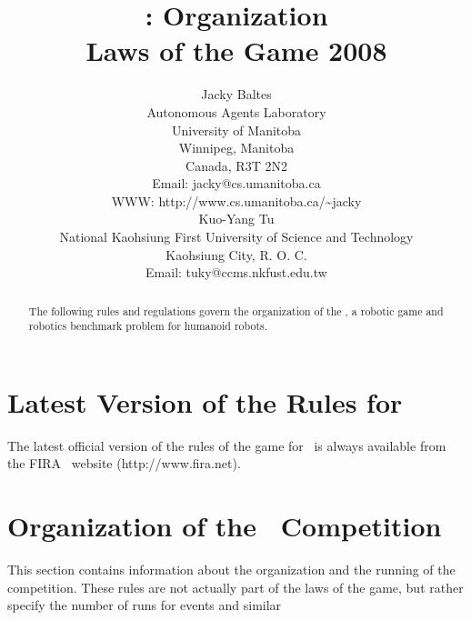 \documentclass[12pt]{hurocup}
\begin{document}
\title{\HuroCup: Organization\\
  Laws of the Game 2008}

\author{Jacky Baltes\\
Autonomous Agents Laboratory\\
University of Manitoba\\
Winnipeg, Manitoba\\
Canada, R3T 2N2\\
Email: jacky@cs.umanitoba.ca\\
WWW: http://www.cs.umanitoba.ca/\~{ }jacky\\[5mm]
Kuo-Yang Tu\\
National Kaohsiung First University of Science and Technology\\
Kaohsiung City, R. O. C.\\
Email: tuky@ccms.nkfust.edu.tw\\
}

\maketitle
\begin{abstract}
The following rules and regulations govern the organization of the
\HuroCup, a robotic game and robotics benchmark problem for humanoid
robots.
%
\end{abstract}

\section*{Latest Version of the Rules for \HuroCup}
\label{sec:updates}

The latest official version of the rules of the game for \HuroCup\ is
always available from the FIRA \HuroCup\ website (http://www.fira.net).

\newpage

\section{Organization of the \HuroCup\ Competition}
\label{sec:organization} 

This section contains information about the organization and the
running of the competition. These rules are not actually part of the
laws of the game, but rather specify the number of runs for events and
similar 

\label{law:number-of-events}
\end{document}
